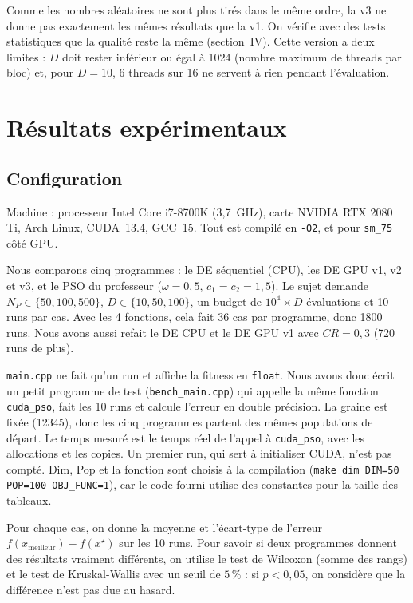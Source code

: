 \documentclass[conference]{IEEEtran}
\begin{document}
Comme les nombres al\'eatoires ne sont plus tir\'es dans le m\^eme ordre, la v3 ne donne pas exactement les m\^emes r\'esultats que la v1. On v\'erifie avec des tests statistiques que la qualit\'e reste la m\^eme (section~IV). Cette version a deux limites : $D$ doit rester inf\'erieur ou \'egal \`a 1024 (nombre maximum de threads par bloc) et, pour $D=10$, 6 threads sur 16 ne servent \`a rien pendant l'\'evaluation.



\section{R\'esultats exp\'erimentaux}

\subsection{Configuration}
Machine : processeur Intel Core i7-8700K (3,7~GHz), carte NVIDIA RTX 2080 Ti, Arch Linux, CUDA~13.4, GCC~15. Tout est compil\'e en \texttt{-O2}, et pour \texttt{sm\_75} c\^ot\'e GPU.

Nous comparons cinq programmes : le DE s\'equentiel (CPU), les DE GPU v1, v2 et v3, et le PSO du professeur ($\omega=0{,}5$, $c_1=c_2=1{,}5$). Le sujet demande $N_P\in\{50,100,500\}$, $D\in\{10,50,100\}$, un budget de $10^4\times D$ \'evaluations et 10 runs par cas. Avec les 4 fonctions, cela fait 36 cas par programme, donc 1800 runs. Nous avons aussi refait le DE CPU et le DE GPU v1 avec $CR=0{,}3$ (720 runs de plus).

\texttt{main.cpp} ne fait qu'un run et affiche la fitness en \texttt{float}. Nous avons donc \'ecrit un petit programme de test (\texttt{bench\_main.cpp}) qui appelle la m\^eme fonction \texttt{cuda\_pso}, fait les 10 runs et calcule l'erreur en double pr\'ecision. La graine est fix\'ee (12345), donc les cinq programmes partent des m\^emes populations de d\'epart. Le temps mesur\'e est le temps r\'eel de l'appel \`a \texttt{cuda\_pso}, avec les allocations et les copies. Un premier run, qui sert \`a initialiser CUDA, n'est pas compt\'e. Dim, Pop et la fonction sont choisis \`a la compilation (\texttt{make dim DIM=50 POP=100 OBJ\_FUNC=1}), car le code fourni utilise des constantes pour la taille des tableaux.

Pour chaque cas, on donne la moyenne et l'\'ecart-type de l'erreur $f(x_{\mathrm{meilleur}})-f(x^\star)$ sur les 10 runs. Pour savoir si deux programmes donnent des r\'esultats vraiment diff\'erents, on utilise le test de Wilcoxon (somme des rangs) et le test de Kruskal-Wallis avec un seuil de $5\,\%$ : si $p<0{,}05$, on consid\`ere que la diff\'erence n'est pas due au hasard.
\end{document}
